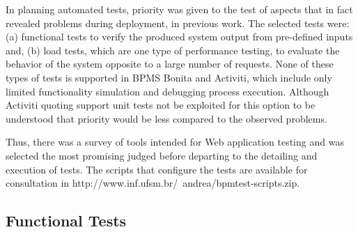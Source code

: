 \documentclass[runningheads,a4paper]{llncs}
\begin{document}
In planning automated tests, priority was given to the test of aspects that in fact revealed problems during deployment, in previous work. The selected tests were: (a) functional tests to verify the produced system output from pre-defined inputs and, (b) load tests, which are one type of performance testing, to evaluate the behavior of the system  opposite to a large number of requests. None of these types of tests is supported in BPMS Bonita and Activiti, which include only limited functionality simulation and debugging process execution. Although Activiti quoting support unit tests not be exploited for this option to be understood that priority would be less compared to the observed problems.

Thus, there was a survey of tools intended for Web application testing and was selected the most promising judged before departing to the detailing and execution of tests. The scripts that configure the tests are available for consultation in http://www.inf.ufsm.br/~andrea/bpmtest-scripts.zip.

\subsection{Functional Tests}

\end{document}
